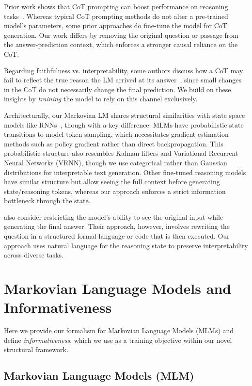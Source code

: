 \documentclass[letterpaper]{article} %
\begin{document}
Prior work shows that CoT prompting can boost performance on reasoning tasks~\citep{wei2022chain}. Whereas typical CoT prompting methods do not alter a pre-trained model's parameters, some prior approaches do fine-tune the model for CoT generation. Our work differs by removing the original question or passage from the answer-prediction context, which enforces a stronger causal reliance on the CoT.

Regarding faithfulness vs. interpretability, some authors discuss how a CoT may fail to reflect the true reason the LM arrived at its answer~\citep{lanham2023measuring, turpin2023language}, since small changes in the CoT do not necessarily change the final prediction. We build on these insights by \emph{training} the model to rely on this channel exclusively.

Architecturally, our Markovian LM shares structural similarities with state space models like RNNs~\citep{rumelhart1986learning}, though with a key difference: MLMs have probabilistic state transitions to model token sampling, which necessitates gradient estimation methods such as policy gradient rather than direct backpropagation. This probabilistic structure also resembles Kalman filters and Variational Recurrent Neural Networks (VRNN), though we use categorical rather than Gaussian distributions for interpretable text generation. Other fine-tuned reasoning models have similar structure but allow seeing the full context before generating state/reasoning tokens, whereas our approach enforces a strict information bottleneck through the state.

\citet{lyu2023faithful} also consider restricting the model's ability to see the original input while generating the final answer. Their approach, however, involves rewriting the question in a structured formal language or code that is then executed. Our approach uses natural language for the reasoning state to preserve interpretability across diverse tasks.

\section{Markovian Language Models and Informativeness}
\label{sec:MLM}

Here we provide our formalism for Markovian Language Models (MLMs) and define \emph{informativeness}, which we use as a training objective within our novel structural framework.

\subsection{Markovian Language Models (MLM)}
\end{document}
